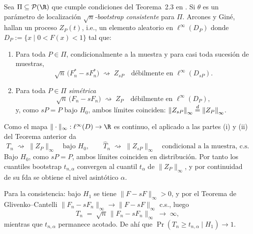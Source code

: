 \begin{teorema}\label{thm:arcones-gine}
    Sea $\Pi\s \mathcal{P}(\R)$ que cumple condiciones del Teorema~2.3 en \cite{arcones1991bootstrap}. Si  $\theta$ es un parámetro de localización $\sqrt{n}$\emph{-bootstrap consistente} para $\Pi$. 
Arcones y Giné, hallan un proceso $Z_P(t)$, i.e., un elemento aleatorio  en $\ell^\infty(D_P)$ donde $D_P:=\{x \mid 0<F(x)<1\}$  tal que:
\begin{enumerate}
  \item[\textup{(i)}] Para toda $P\in\Pi$, condicionalmente a la muestra y para casi
        toda sucesión de muestras,
        \[
          \sqrt{n}\,\bigl(F_n^{*}-sF_n^{*}\bigr) \;\rightsquigarrow\; Z_{sP}
          \quad\text{débilmente en } \ell^\infty(D_{sP}).
        \]
  \item[\textup{(ii)}] Para toda $P\in\Pi$ \emph{simétrica}
        \[
          \sqrt{n}\,\bigl(F_n-sF_n\bigr) \;\rightsquigarrow\; Z_{P}
          \quad\text{débilmente en } \ell^\infty(D_{P}),
        \]
        y, como $sP=P$ bajo $H_0$, ambos límites coinciden:
        $\left\lVert Z_{sP} \right\rVert_\infty \overset{d}{=} \left\lVert Z_P \right\rVert_\infty$.
\end{enumerate}
\end{teorema}

\medskip

Como el mapa $\|\cdot\|_\infty : \ell^\infty(D) \to \R$ es continuo, el
  aplicado a las partes \textup{(i)} y
\textup{(ii)} del Teorema anterior da
\[
  T_n \;\rightsquigarrow\; \|Z_P\|_\infty \quad \text{bajo } H_0,
  \qquad
  \widehat{T}_n \;\rightsquigarrow\; \|Z_{sP}\|_\infty
  \quad \text{condicional a la muestra, c.s.}
\]
Bajo $H_0$, como $sP = P$, ambos límites coinciden en distribución. Por tanto los
cuantiles bootstrap $t_{n,\alpha}$ convergen al cuantil $t_\alpha$ de $\|Z_P\|_\infty$, y
por continuidad de su fda se obtiene el nivel asintótico $\alpha$.

Para la consistencia: bajo $H_1$ se tiene $\|F - sF\|_\infty > 0$, y por el Teorema de
Glivenko--Cantelli $\|F_n - sF_n\|_\infty \to \|F - sF\|_\infty$ c.s., luego
\[
  T_n \;=\; \sqrt{n}\,\|F_n - sF_n\|_\infty \;\longrightarrow\; \infty,
\]
mientras que $t_{n,\alpha}$ permanece acotado. De ahí que
$\Pr(T_n \ge t_{n,\alpha} \mid H_1) \to 1$.
\medskip


